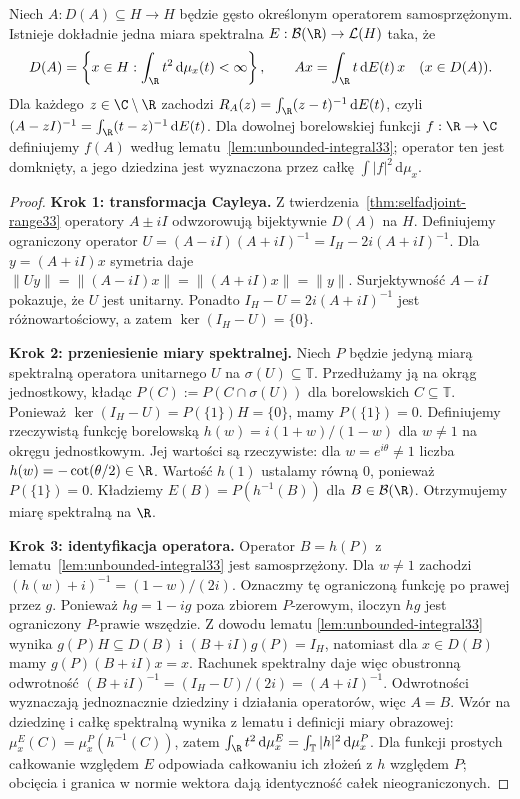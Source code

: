 \begin{twierdzenie}
\label{thm:unbounded-spectral33}
Niech $A:D(A)\subseteq H\to H$ będzie gęsto określonym
operatorem samosprzężonym. Istnieje dokładnie jedna miara spektralna
$E:\mathcal B(\R)\to\mathcal L(H)$ taka, że
\[
 D(A)=\left\{x\in H:\int_\R t^2\,\mathrm d\mu_x(t)<\infty\right\},
 \qquad Ax=\int_\R t\,\mathrm dE(t)\,x\quad(x\in D(A)).
\]
Dla każdego $z\in\C\setminus\R$ zachodzi
$R_A(z)=\int_\R(z-t)^{-1}\,\mathrm dE(t)$, czyli
$(A-zI)^{-1}=\int_\R(t-z)^{-1}\,\mathrm dE(t)$.
Dla dowolnej borelowskiej funkcji $f:\R\to\C$
definiujemy $f(A)$ według
lematu~\ref{lem:unbounded-integral33}; operator ten jest domknięty,
a jego dziedzina jest wyznaczona przez całkę $\int|f|^2\,\mathrm d\mu_x$.
\end{twierdzenie}
\begin{proof}
\textbf{Krok 1: transformacja Cayleya.}
Z twierdzenia~\ref{thm:selfadjoint-range33} operatory
$A\pm iI$ odwzorowują bijektywnie $D(A)$ na $H$.
Definiujemy ograniczony operator
$U=(A-iI)(A+iI)^{-1}=I_H-2i(A+iI)^{-1}$.
Dla $y=(A+iI)x$ symetria daje
$\|Uy\|=\|(A-iI)x\|=\|(A+iI)x\|=\|y\|$.
Surjektywność $A-iI$ pokazuje, że $U$ jest unitarny.
Ponadto $I_H-U=2i(A+iI)^{-1}$ jest różnowartościowy,
a zatem $\ker(I_H-U)=\{0\}$.

\textbf{Krok 2: przeniesienie miary spektralnej.}
Niech $P$ będzie jedyną miarą spektralną operatora
unitarnego $U$ na $\sigma(U)\subseteq\mathbb T$.
Przedłużamy ją na okrąg jednostkowy, kładąc
$P(C):=P(C\cap\sigma(U))$ dla borelowskich $C\subseteq\mathbb T$.
Ponieważ $\ker(I_H-U)=P(\{1\})H=\{0\}$,
mamy $P(\{1\})=0$. Definiujemy rzeczywistą funkcję borelowską
$h(w)=i(1+w)/(1-w)$ dla $w\ne1$ na okręgu jednostkowym.
Jej wartości są rzeczywiste: dla $w=e^{i\theta}\ne1$
liczba $h(w)=-\cot(\theta/2)\in\R$.
Wartość $h(1)$ ustalamy równą $0$, ponieważ $P(\{1\})=0$.
Kładziemy $E(B)=P(h^{-1}(B))$ dla $B\in\mathcal B(\R)$.
Otrzymujemy miarę spektralną na $\R$.

\textbf{Krok 3: identyfikacja operatora.}
Operator $B=h(P)$ z lematu~\ref{lem:unbounded-integral33}
jest samosprzężony. Dla $w\ne1$ zachodzi
$(h(w)+i)^{-1}=(1-w)/(2i)$.
Oznaczmy tę ograniczoną funkcję po prawej przez $g$.
Ponieważ $hg=1-ig$ poza zbiorem $P$-zerowym, iloczyn $hg$
jest ograniczony $P$-prawie wszędzie. Z dowodu lematu
\ref{lem:unbounded-integral33} wynika $g(P)H\subseteq D(B)$
i $(B+iI)g(P)=I_H$, natomiast dla $x\in D(B)$ mamy
$g(P)(B+iI)x=x$. Rachunek spektralny daje więc obustronną odwrotność
$(B+iI)^{-1}=(I_H-U)/(2i)=(A+iI)^{-1}$.
Odwrotności wyznaczają jednoznacznie dziedziny i działania
operatorów, więc $A=B$. Wzór na dziedzinę i całkę
spektralną wynika z lematu i definicji miary obrazowej:
$\mu_x^E(C)=\mu_x^P(h^{-1}(C))$, zatem
$\int_\R t^2\,\mathrm d\mu_x^E=\int_{\mathbb T}|h|^2\,\mathrm d\mu_x^P$.
Dla funkcji prostych całkowanie względem $E$ odpowiada
całkowaniu ich złożeń z $h$ względem $P$; obcięcia i granica
w normie wektora dają identyczność całek nieograniczonych.


\end{proof}
